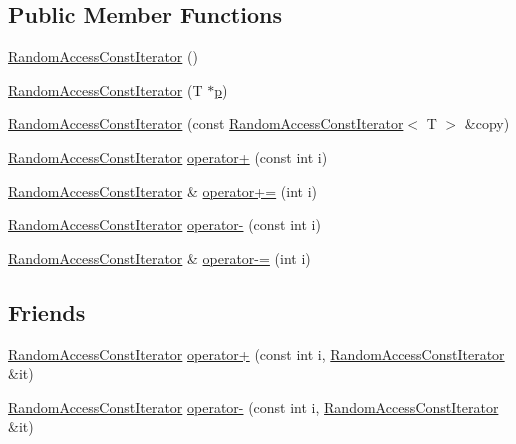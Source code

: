 \subsection*{Public Member Functions}
\begin{DoxyCompactItemize}
\item 
\hyperlink{classprism_1_1containers_1_1_random_access_const_iterator_ae4a680510f3ffa50f495dd077aad6477}{Random\+Access\+Const\+Iterator} ()
\item 
\hyperlink{classprism_1_1containers_1_1_random_access_const_iterator_aa34c3453ceb7337dde59bd13576c18aa}{Random\+Access\+Const\+Iterator} (T $\ast$\hyperlink{classprism_1_1containers_1_1_forward_const_iterator_a26647b955a51f4fb4d29d1b06dd75cd9}{p})
\item 
\hyperlink{classprism_1_1containers_1_1_random_access_const_iterator_acf3d0c403561d514dbc552fd57a2e325}{Random\+Access\+Const\+Iterator} (const \hyperlink{classprism_1_1containers_1_1_random_access_const_iterator}{Random\+Access\+Const\+Iterator}$<$ T $>$ \&copy)
\item 
\hyperlink{classprism_1_1containers_1_1_random_access_const_iterator}{Random\+Access\+Const\+Iterator} \hyperlink{classprism_1_1containers_1_1_random_access_const_iterator_a8a47a5a4c69d1d3a8f4a718b14bb92a3}{operator+} (const int i)
\item 
\hyperlink{classprism_1_1containers_1_1_random_access_const_iterator}{Random\+Access\+Const\+Iterator} \& \hyperlink{classprism_1_1containers_1_1_random_access_const_iterator_a1f1827f3567229df87750a450861f727}{operator+=} (int i)
\item 
\hyperlink{classprism_1_1containers_1_1_random_access_const_iterator}{Random\+Access\+Const\+Iterator} \hyperlink{classprism_1_1containers_1_1_random_access_const_iterator_a9baaeb7ccdb9686681b2b10653fd85a6}{operator-\/} (const int i)
\item 
\hyperlink{classprism_1_1containers_1_1_random_access_const_iterator}{Random\+Access\+Const\+Iterator} \& \hyperlink{classprism_1_1containers_1_1_random_access_const_iterator_ae396d5809400cdf096f9b147351a115a}{operator-\/=} (int i)
\end{DoxyCompactItemize}
\subsection*{Friends}
\begin{DoxyCompactItemize}
\item 
\hyperlink{classprism_1_1containers_1_1_random_access_const_iterator}{Random\+Access\+Const\+Iterator} \hyperlink{classprism_1_1containers_1_1_random_access_const_iterator_a6bff6ca7fb4bbb4122adc5077b52415d}{operator+} (const int i, \hyperlink{classprism_1_1containers_1_1_random_access_const_iterator}{Random\+Access\+Const\+Iterator} \&it)
\item 
\hyperlink{classprism_1_1containers_1_1_random_access_const_iterator}{Random\+Access\+Const\+Iterator} \hyperlink{classprism_1_1containers_1_1_random_access_const_iterator_a99577c4e83e9b20e01230b8fb377215a}{operator-\/} (const int i, \hyperlink{classprism_1_1containers_1_1_random_access_const_iterator}{Random\+Access\+Const\+Iterator} \&it)
\end{DoxyCompactItemize}
